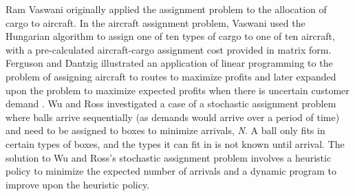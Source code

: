 Ram Vaswani \cite{vaswani} originally applied the assignment problem to the allocation of cargo to aircraft. In the aircraft assignment problem, Vaswani used the Hungarian algorithm to assign one of ten types of cargo to one of ten aircraft, with a pre-calculated aircraft-cargo assignment cost provided in matrix form.  Ferguson and Dantzig \cite{ferguson_dantzig_aircraftRouting} illustrated an application
of linear programming to the problem of assigning aircraft
to routes to maximize profits and later expanded upon the problem to maximize expected profits when there is
uncertain customer demand \cite{ferguson_dantzig_uncertainDemand}. Wu and Ross \cite{WuRoss2014} investigated a case of a stochastic assignment problem where balls arrive sequentially (as demands would arrive over a period of time) and need to be assigned to boxes  to minimize arrivals, \textit{N}.  A ball only fits in certain types of boxes, and the types it can fit in is not known until arrival. The solution to Wu and Ross's stochastic assignment problem involves a heuristic policy to minimize the expected number of arrivals and a dynamic program to improve upon the heuristic policy.       

